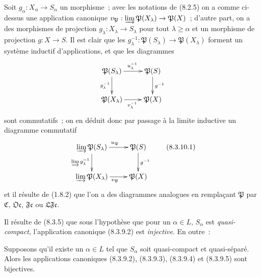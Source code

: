 \begin{env}[8.3.10]
\label{IV.8.3.10-fr}
Soit $g_\alpha:X_\alpha\to S_\alpha$ un morphisme~; avec les notations de
(8.2.5) on a comme ci-dessus une application canonique
$v_{\mathfrak P}:\varinjlim\mathfrak P(X_\lambda)\to\mathfrak P(X)$~;
d'autre part, on a des morphismes de projection
$g_\lambda:X_\lambda\to S_\lambda$ pour tout $\lambda\geq\alpha$ et un
morphisme de projection $g:X\to S$. Il est clair que les
$g_\lambda^{-1}:\mathfrak P(S_\lambda)\to\mathfrak P(X_\lambda)$ forment un
système inductif d'applications, et que les diagrammes
\[
\xymatrix{
  \mathfrak P(S_\lambda) \ar[r]^{u_\lambda^{-1}} \ar[d]_{g_\lambda^{-1}}
    & \mathfrak P(S) \ar[d]^{g^{-1}} \\
  \mathfrak P(X_\lambda) \ar[r]_{v_\lambda^{-1}} & \mathfrak P(X)
}
\]
sont commutatifs~; on en déduit donc par passage à la limite inductive un
diagramme commutatif
\begin{equation}
\xymatrix{
  \varinjlim\mathfrak P(S_\lambda) \ar[r]^{u_{\mathfrak P}}
    \ar[d]_{\varinjlim g_\lambda^{-1}}
    & \mathfrak P(S) \ar[d]^{g^{-1}} \\
  \varinjlim\mathfrak P(X_\lambda) \ar[r]_{v_{\mathfrak P}}
    & \mathfrak P(X)
}
\tag{8.3.10.1}\label{IV.8.3.10.1-fr}
\end{equation}
et il résulte de (1.8.2) que l'on a des diagrammes analogues en remplaçant
$\mathfrak P$ par $\mathfrak C$, $\mathfrak{Oc}$, $\mathfrak{Fc}$ ou
$\mathfrak{LFc}$.
\end{env}

Il résulte de (8.3.5) que sous l'hypothèse que pour un $\alpha\in L$,
$S_\alpha$ est \emph{quasi-compact}, l'application canonique (8.3.9.2) est
\emph{injective}. En outre~:

\begin{theorem}[8.3.11]
\label{IV.8.3.11-fr}
Supposons qu'il existe un $\alpha\in L$ tel que $S_\alpha$ soit quasi-compact
et quasi-séparé. Alors les applications canoniques \textup{(8.3.9.2), (8.3.9.3),
(8.3.9.4)} et \textup{(8.3.9.5)} sont bijectives.
\end{theorem}

